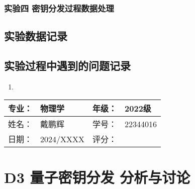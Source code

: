 \documentclass[dvipsnames, svgnames,a4paper,11pt]{article}
\begin{document}
	\subsubsection{实验四 \quad 密钥分发过程数据处理}


\subsection{实验数据记录}










\subsection{实验过程中遇到的问题记录}

\begin{enumerate}
	\item 
	
\end{enumerate}
	

\clearpage
\begin{table}
	\renewcommand\arraystretch{1.7}
	\begin{tabularx}{\textwidth}{|X|X|X|X|}
	\hline
	专业：& 物理学 &年级：& 2022级\\
	\hline
	姓名： & 戴鹏辉 & 学号：& 22344016\\
	\hline
    日期：& 2024/XXXX & 评分： &\\
	\hline
	\end{tabularx}
\end{table}

\section{D3 \quad 量子密钥分发 \quad\heiti 分析与讨论}
\end{document}
